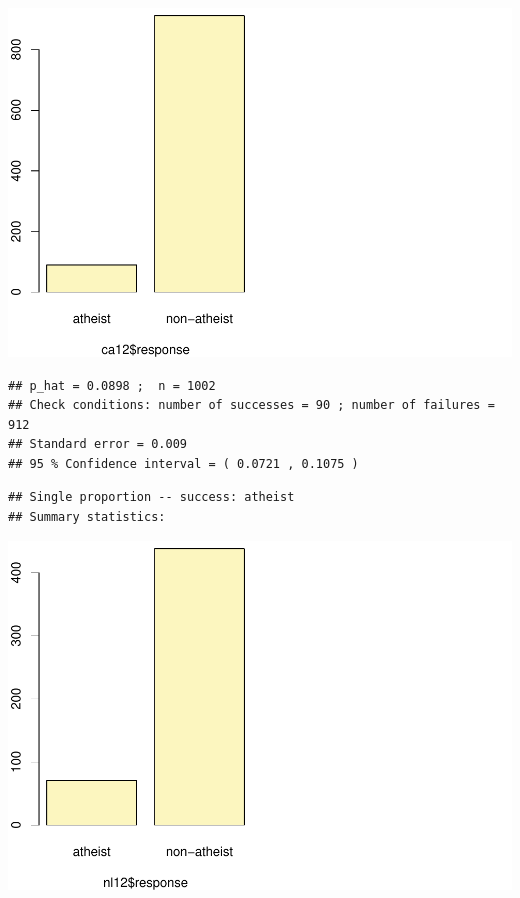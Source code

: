 \documentclass[]{article}
\newenvironment{Shaded}{\begin{snugshade}}{\end{snugshade}}
\newcommand{\KeywordTok}[1]{\textcolor[rgb]{0.13,0.29,0.53}{\textbf{#1}}}
\newcommand{\DataTypeTok}[1]{\textcolor[rgb]{0.13,0.29,0.53}{#1}}
\newcommand{\StringTok}[1]{\textcolor[rgb]{0.31,0.60,0.02}{#1}}
\newcommand{\OperatorTok}[1]{\textcolor[rgb]{0.81,0.36,0.00}{\textbf{#1}}}
\newcommand{\NormalTok}[1]{#1}
\begin{document}
\includegraphics{DATA_606_Lab_6_files/figure-latex/unnamed-chunk-3-1.pdf}

\begin{verbatim}
## p_hat = 0.0898 ;  n = 1002 
## Check conditions: number of successes = 90 ; number of failures = 912 
## Standard error = 0.009 
## 95 % Confidence interval = ( 0.0721 , 0.1075 )
\end{verbatim}

\begin{Shaded}
\end{Shaded}

\begin{verbatim}
## Single proportion -- success: atheist 
## Summary statistics:
\end{verbatim}

\includegraphics{DATA_606_Lab_6_files/figure-latex/unnamed-chunk-3-2.pdf}
\end{document}
